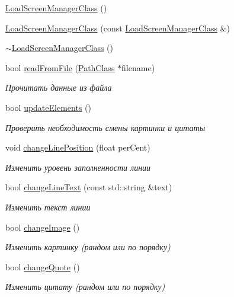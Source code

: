 \begin{DoxyCompactItemize}
\item 
\hyperlink{class_load_screen_manager_class_a2e7a755a0176b52eaab4bb531747e788}{Load\+Screen\+Manager\+Class} ()
\item 
\hyperlink{class_load_screen_manager_class_a0cd35e842dc744fe8786118da22decf5}{Load\+Screen\+Manager\+Class} (const \hyperlink{class_load_screen_manager_class}{Load\+Screen\+Manager\+Class} \&)
\item 
\hyperlink{class_load_screen_manager_class_a836486d1d96adde3b0e0ab387399d326}{$\sim$\+Load\+Screen\+Manager\+Class} ()
\item 
bool \hyperlink{class_load_screen_manager_class_a72fd6441d9f47485b5b4baab389b56fa}{read\+From\+File} (\hyperlink{class_path_class}{Path\+Class} $\ast$filename)
\begin{DoxyCompactList}\small\item\em Прочитать данные из файла \end{DoxyCompactList}\item 
bool \hyperlink{class_load_screen_manager_class_a244ce822d442e75c3a98e19460fce0a4}{update\+Elements} ()
\begin{DoxyCompactList}\small\item\em Проверить необходимость смены картинки и цитаты \end{DoxyCompactList}\item 
void \hyperlink{class_load_screen_manager_class_a74f3949d537878e1b1c67beb4304caf3}{change\+Line\+Position} (float per\+Cent)
\begin{DoxyCompactList}\small\item\em Изменить уровень заполненности линии \end{DoxyCompactList}\item 
bool \hyperlink{class_load_screen_manager_class_a48c99f2053eb880ee9550bda62cc01ad}{change\+Line\+Text} (const std\+::string \&text)
\begin{DoxyCompactList}\small\item\em Изменить текст линии \end{DoxyCompactList}\item 
bool \hyperlink{class_load_screen_manager_class_a351cd38c2b2263e27f56c668027e3c8b}{change\+Image} ()
\begin{DoxyCompactList}\small\item\em Изменить картинку (рандом или по порядку) \end{DoxyCompactList}\item 
bool \hyperlink{class_load_screen_manager_class_a83f095d4673cc347f0a03f1608a88f88}{change\+Quote} ()
\begin{DoxyCompactList}\small\item\em Изменить цитату (рандом или по порядку) \end{DoxyCompactList}\end{DoxyCompactItemize}
